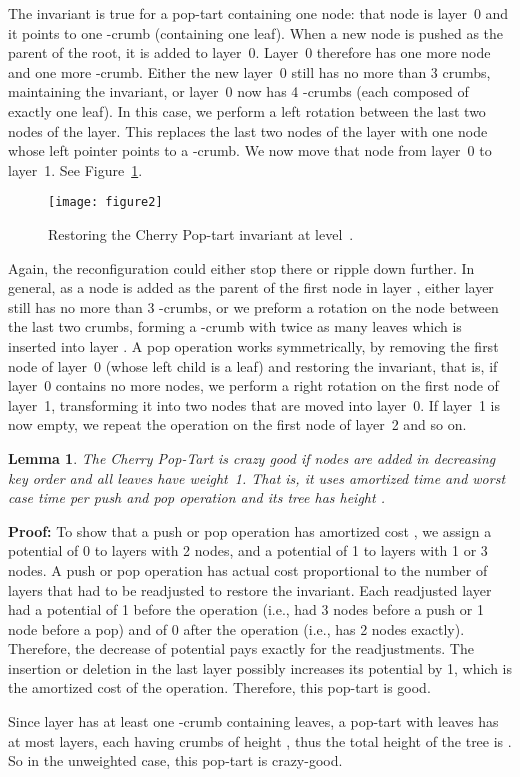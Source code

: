 \documentclass[11pt]{article}
\newtheorem{lemma}[theorem]{Lemma}
\newenvironment{proof}{\noindent\textbf{Proof: }\ignorespaces}
  {\hspace*{\fill}\medskip}
\begin{document}
The invariant is true for a pop-tart containing one node: that node is
layer~0 and it points to one -crumb (containing one leaf). When a new
node is pushed as the parent of the root, it is added to
layer~0. Layer~0 therefore has one more node and one more
-crumb. Either the new layer~0 still has no more than 3 crumbs,
maintaining the invariant, or layer~0 now has 4 -crumbs (each
composed of exactly one leaf). In this case, we perform a left rotation
between the last two nodes of the layer. This replaces the last two
nodes of the layer with one node whose left pointer points to a
-crumb. We now move that node from layer~0 to layer~1. See
Figure~\ref{fig:cherry-pop-tart-rot}.
\begin{figure}
\begin{center}
\texttt{[image: figure2]} 
\end{center}
\caption{Restoring the Cherry Pop-tart invariant at level~.}
\label{fig:cherry-pop-tart-rot}
\end{figure} 
Again, the reconfiguration could either stop there or ripple down
further.  In general, as a node is added as the parent of the first node
in layer , either layer  still has no more than 3
-crumbs, or we preform a rotation on the node between the last two
crumbs, forming a -crumb with twice as many leaves which is
inserted into layer . A pop operation works symmetrically, by
removing the first node of layer~0 (whose left child is a leaf) and
restoring the invariant, that is, if layer~0 contains no more nodes,
we perform a right rotation on the first node of layer~1, transforming
it into two nodes that are moved into layer~0.  If layer~1 is now empty,
we repeat the operation on the first node of layer~2 and so on.

\begin{lemma}
The Cherry Pop-Tart is crazy good if nodes are added in decreasing
key order and all leaves have weight~1. That
is, it uses  amortized time and  worst case time per
push and pop operation and its tree has height . 
\end{lemma}
\begin{proof}
To show that a push or pop operation has amortized cost
, we assign a potential of 0 to layers with 2 nodes,
and a potential of 1 to layers with 1 or 3 nodes. A push or pop
operation has actual cost proportional to the number of layers that
had to be readjusted to restore the invariant. Each readjusted layer had
a potential of 1 before the operation (i.e., had 3 nodes before a push
or 1 node before a pop) and of 0 after the operation (i.e., has 2
nodes exactly). Therefore, the decrease of potential pays exactly for
the readjustments. The insertion or deletion in the last layer possibly
increases its potential by 1, which is the amortized cost of the
operation. Therefore, this pop-tart is good.

Since layer  has at least one -crumb containing  leaves, a
pop-tart with  leaves has at most  layers, each having crumbs
of height , thus the total height of the tree is .
So in the unweighted case, this pop-tart is crazy-good.
\end{proof}
\end{document}
